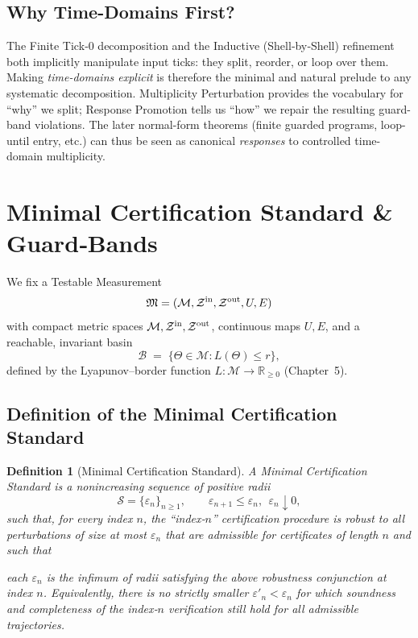 \documentclass[12pt]{article}
\newtheorem{definition}{Definition}[section]
\begin{document}
\subsection*{Why Time-Domains First?}


The Finite Tick‑0 decomposition and the Inductive (Shell‑by‑Shell) refinement both implicitly manipulate input ticks: they split, reorder, or loop over them.  Making \emph{time-domains explicit} is therefore the minimal and natural prelude to any systematic decomposition.  Multiplicity Perturbation provides the vocabulary for “why” we split; Response Promotion tells us “how” we repair the resulting guard-band violations.  The later normal-form theorems (finite guarded programs, loop-until entry, etc.) can thus be seen as canonical \emph{responses} to controlled time-domain multiplicity.

\section{Minimal Certification Standard \& Guard‑Bands}
\label{sec:min-standard-guardbands}

We fix a Testable Measurement
\[
  \mathfrak M=(\mathcal M,\mathcal Z^{\rm in},\mathcal Z^{\rm out},U,E)
\]
with compact metric spaces \(\mathcal M,\mathcal Z^{\rm in},\mathcal Z^{\rm out}\), continuous maps \(U,E\), and a reachable, invariant basin
\[
  \mathcal B \;=\; \{\Theta\in\mathcal M : L(\Theta)\le r\},
\]
defined by the Lyapunov–border function \(L:\mathcal M\to\mathbb R_{\ge0}\) (Chapter~5).

\subsection*{Definition of the Minimal Certification Standard}

\begin{definition}[Minimal Certification Standard]
\label{def:minimal-standard}
A \emph{Minimal Certification Standard} is a nonincreasing sequence of positive radii
\[
  \mathcal S=\{\varepsilon_n\}_{n\ge1},
  \qquad
  \varepsilon_{n+1}\le\varepsilon_n,\ \ \varepsilon_n\downarrow 0,
\]
such that, for every index \(n\), the “index‑\(n\)” certification procedure is robust to all perturbations of size at most \(\varepsilon_n\) that are admissible for certificates of length \(n\) and such that

\medskip
 each \(\varepsilon_n\) is the \emph{infimum} of radii satisfying the above robustness conjunction at index \(n\).  Equivalently, there is no strictly smaller \(\varepsilon'_n<\varepsilon_n\) for which soundness and completeness of the index‑\(n\) verification still hold for all admissible trajectories.
\end{definition}
\end{document}
